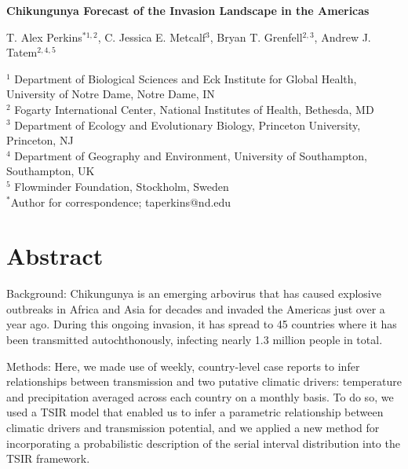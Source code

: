 \documentclass[11pt]{article}
\begin{document}
\begin{center}{\Large\textbf{
Chikungunya Forecast of the Invasion Landscape in the Americas}}
\end{center}

\begin{center}
T. Alex Perkins$^{\ast 1,2}$, C. Jessica E. Metcalf$^{3}$, Bryan T. Grenfell$^{2,3}$, Andrew J. Tatem$^{2,4,5}$
\end{center}

\vspace{8pt}

\mbox{}\hspace{.2in}\begin{minipage}[h]{5.3in}
\scriptsize{$^{1}$ Department of Biological Sciences and Eck Institute for Global Health, University of Notre Dame, Notre Dame, IN}\\
\scriptsize{$^{2}$ Fogarty International Center, National Institutes of Health, Bethesda, MD}\\
\scriptsize{$^{3}$ Department of Ecology and Evolutionary Biology, Princeton University, Princeton, NJ}\\
\scriptsize{$^{4}$ Department of Geography and Environment, University of Southampton, Southampton, UK}\\
\scriptsize{$^{5}$ Flowminder Foundation, Stockholm, Sweden}\\
\scriptsize{$^\ast$Author for correspondence; taperkins@nd.edu}\\
\end{minipage}

\thispagestyle{empty}


\linenumbers
\section*{Abstract}
Background: Chikungunya is an emerging arbovirus that has caused explosive outbreaks in Africa and Asia for decades and invaded the Americas just over a year ago. During this ongoing invasion, it has spread to 45 countries where it has been transmitted autochthonously, infecting nearly 1.3 million people in total.

\noindent Methods: Here, we made use of weekly, country-level case reports to infer relationships between transmission and two putative climatic drivers: temperature and precipitation averaged across each country on a monthly basis. To do so, we used a TSIR model that enabled us to infer a parametric relationship between climatic drivers and transmission potential, and we applied a new method for incorporating a probabilistic description of the serial interval distribution into the TSIR framework.
\end{document}
